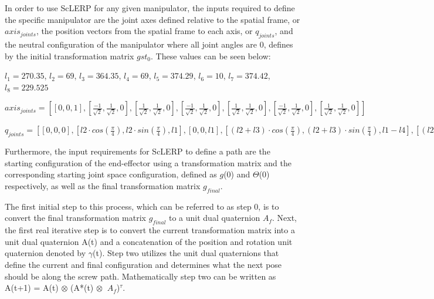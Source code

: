 \documentclass[11pt]{article}
\begin{document}
In order to use ScLERP for any given manipulator, the inputs required to define the specific manipulator are the joint axes defined relative to the spatial frame, or $axis_{joints}$, the position vectors from the spatial frame to each axis, or $q_{joints}$, and the neutral configuration of the manipulator where all joint angles are 0, defines by the initial transformation matrix $gst_0$. These values can be seen below:
\newline

$l_1 = 270.35$, $l_2 = 69$, $l_3 = 364.35$, $l_4 = 69$, $l_5 = 374.29$, $l_6 = 10$, $l_7 = 374.42$, $l_8 = 229.525$
\newline

$axis_{joints} = [[0, 0, 1], [\frac{-1}{\sqrt{2}}, \frac{1}{\sqrt{2}}, 0], [\frac{1}{\sqrt{2}}, \frac{1}{\sqrt{2}}, 0], [\frac{-1}{\sqrt{2}}, \frac{1}{\sqrt{2}}, 0], [\frac{1}{\sqrt{2}}, \frac{1}{\sqrt{2}}, 0], [\frac{-1}{\sqrt{2}}, \frac{1}{\sqrt{2}}, 0], [\frac{1}{\sqrt{2}}, \frac{1}{\sqrt{2}}, 0]]$
\newline

$q_{joints} = [[0, 0, 0], [l2 \cdot cos(\frac{\pi}{4}), l2 \cdot sin(\frac{\pi}{4}), l1], [0, 0, l1], [(l2 + l3) \cdot cos(\frac{\pi}{4}), (l2 + l3) \cdot sin(\frac{\pi}{4}), l1 - l4], [(l2 + l3) \cdot cos(\frac{\pi}{4}), (l2 + l3) \cdot sin(\frac{\pi}{4}), l1 - l4], [(l2 + l3 + l5) \cdot cos(\frac{\pi}{4}), (l2 + l3 + l5) \cdot sin(\frac{\pi}{4}), l1 - l4 - l6], [(l2 + l3 + l5) \cdot cos(\frac{\pi}{4}), (l2 + l3 + l5) \cdot sin(\frac{\pi}{4}), l1 - l4 - l6]]$
\newline

 Furthermore, the input requirements for ScLERP to define a path are the starting configuration of the end-effector using a transformation matrix and the corresponding starting joint space configuration, defined as $g$(0) and $\Theta$(0) respectively, as well as the final transformation matrix  $g_{final}$. 
\newline

The first initial step to this process, which can be referred to as step 0, is to convert the final transformation matrix $g_{final}$ to a unit dual quaternion $A_f$. Next, the first real iterative step is to convert the current transformation matrix into a unit dual quaternion A(t) and a concatenation of the position and rotation unit quaternion denoted by $\gamma$(t). Step two utilizes the unit dual quaternions that define the current and final configuration and determines what the next pose should be along the screw path. Mathematically step two can be written as A(t+1) = A(t)  $\otimes$  (A*(t) $\otimes$ $\ A_f$)$^\tau$. 
\newline
\end{document}
